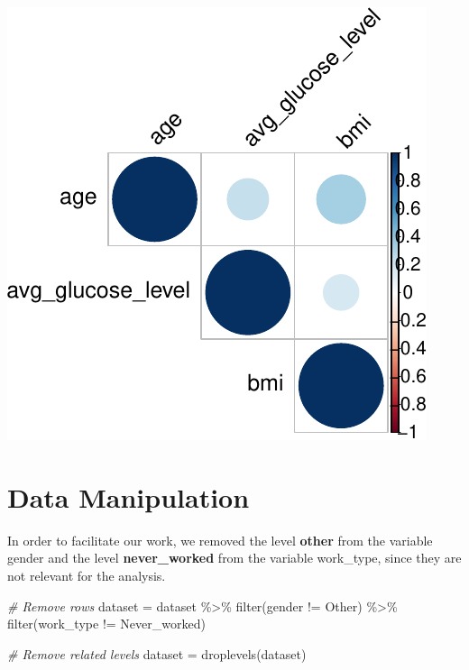 \documentclass[
]{article}
\newenvironment{Shaded}{\begin{snugshade}}{\end{snugshade}}
\newcommand{\CommentTok}[1]{\textcolor[rgb]{0.56,0.35,0.01}{\textit{#1}}}
\newcommand{\FunctionTok}[1]{\textcolor[rgb]{0.00,0.00,0.00}{#1}}
\newcommand{\NormalTok}[1]{#1}
\newcommand{\OtherTok}[1]{\textcolor[rgb]{0.56,0.35,0.01}{#1}}
\newcommand{\SpecialCharTok}[1]{\textcolor[rgb]{0.00,0.00,0.00}{#1}}
\newcommand{\StringTok}[1]{\textcolor[rgb]{0.31,0.60,0.02}{#1}}
\begin{document}
\begin{center}\includegraphics{report_files/figure-latex/unnamed-chunk-8-1} \end{center}

\section{Data Manipulation}

In order to facilitate our work, we removed the level \textbf{other}
from the variable gender and the level \textbf{never\_worked} from the
variable work\_type, since they are not relevant for the analysis.\\

\begin{Shaded}
\begin{Highlighting}[]
\CommentTok{\# Remove rows}
\NormalTok{dataset }\OtherTok{=}\NormalTok{ dataset }\SpecialCharTok{\%\textgreater{}\%}
          \FunctionTok{filter}\NormalTok{(gender }\SpecialCharTok{!=} \StringTok{\textquotesingle{}Other\textquotesingle{}}\NormalTok{) }\SpecialCharTok{\%\textgreater{}\%}
          \FunctionTok{filter}\NormalTok{(work\_type }\SpecialCharTok{!=} \StringTok{\textquotesingle{}Never\_worked\textquotesingle{}}\NormalTok{)}

\CommentTok{\# Remove related levels}
\NormalTok{dataset }\OtherTok{=} \FunctionTok{droplevels}\NormalTok{(dataset)}
\end{Highlighting}
\end{Shaded}
\end{document}

